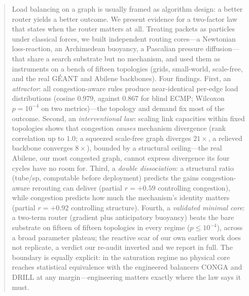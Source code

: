 \begin{abstract}
Load balancing on a graph is usually framed as algorithm design: a better
router yields a better outcome. We present evidence for a two-factor law that
states when the router matters at all. Treating packets as particles under
classical forces, we built independent routing cores---a Newtonian
loss-reaction, an Archimedean buoyancy, a Pascalian pressure diffusion---that
share a search substrate but no mechanism, and used them as instruments on a
bench of fifteen topologies (grids, small-world, scale-free, and the real
G\'EANT and Abilene backbones). Four findings. First, an \emph{attractor}: all
congestion-aware rules produce near-identical per-edge load distributions
(cosine $0.979$, against $0.867$ for blind ECMP; Wilcoxon $p=10^{-4}$ on two
metrics)---the topology and demand fix most of the outcome. Second, an
\emph{interventional law}: scaling link capacities within fixed topologies
shows that congestion \emph{causes} mechanism divergence (rank correlation up
to $1.0$; a squeezed scale-free graph diverges $21\times$, a relieved backbone
converges $8\times$), bounded by a structural ceiling---the real Abilene, our
most congested graph, cannot express divergence its four cycles have no room
for. Third, a \emph{double dissociation}: a structural ratio (tube/sp,
computable before deployment) predicts the gains congestion-aware rerouting
can deliver (partial $r=+0.59$ controlling congestion), while congestion
predicts how much the mechanism's identity matters (partial $r=+0.92$
controlling structure). Fourth, a \emph{validated minimal core}: a two-term
router (gradient plus anticipatory buoyancy) beats the bare substrate on
fifteen of fifteen topologies in every regime ($p\le 10^{-4}$), across a broad
parameter plateau; the reactive scar of our own earlier work does not
replicate, a verdict our re-audit inverted and we report in full. The boundary
is equally explicit: in the saturation regime no physical core reaches
statistical equivalence with the engineered balancers CONGA and DRILL at any
margin---engineering matters exactly where the law says it must.
\end{abstract}
